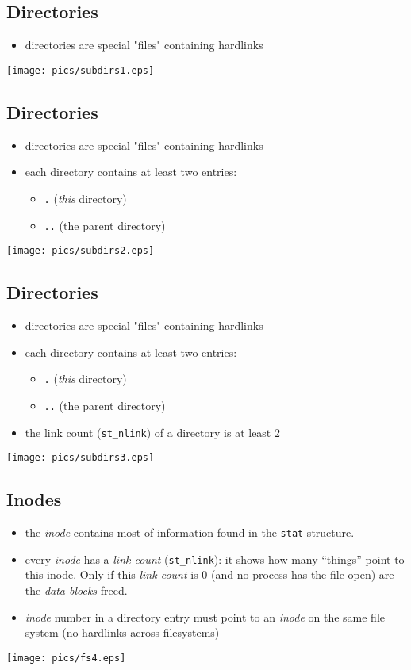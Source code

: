 \documentclass[xga]{xdvislides}
\begin{document}
\subsection{Directories}
\begin{itemize}
	\item directories are special "files" containing hardlinks
\end{itemize}
\texttt{[image: pics/subdirs1.eps]}

\subsection{Directories}
\begin{itemize}
	\item directories are special "files" containing hardlinks
	\item each directory contains at least two entries:
		\begin{itemize}
			\item {\tt .} ({\em this} directory)
			\item {\tt ..} (the parent directory)
		\end{itemize}
\end{itemize}
\texttt{[image: pics/subdirs2.eps]}

\subsection{Directories}
\begin{itemize}
	\item directories are special "files" containing hardlinks
	\item each directory contains at least two entries:
		\begin{itemize}
			\item {\tt .} ({\em this} directory)
			\item {\tt ..} (the parent directory)
		\end{itemize}
	\item the link count ({\tt st\_nlink}) of a directory is at least $2$
\end{itemize}
\texttt{[image: pics/subdirs3.eps]}

\subsection{Inodes}
\begin{itemize}
	\item the {\em inode} contains most of information found in the {\tt stat}
		structure.
	\item every {\em inode} has a {\em link count} ({\tt st\_nlink}):  it
		shows how many ``things'' point to this inode.  Only if this
		{\em link count} is 0 (and no process has the file open) are the
		{\em data blocks} freed.
	\item {\em inode} number in a directory entry must point to an {\em inode}
		on the same file system (no hardlinks across filesystems)
\end{itemize}
\texttt{[image: pics/fs4.eps]}
\end{document}
